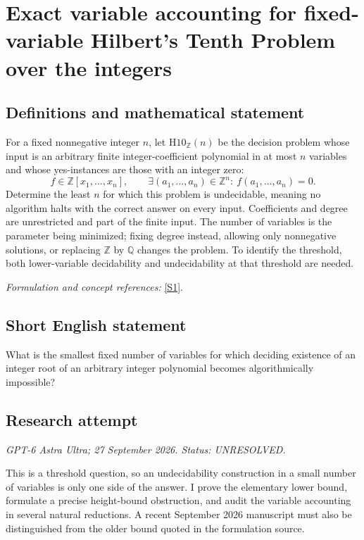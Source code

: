 \documentclass[11pt]{article}
\begin{document}
\section*{\texorpdfstring{Exact variable accounting for fixed-variable Hilbert's Tenth Problem over the integers}{Exact variable accounting for fixed-variable Hilbert's Tenth Problem over the integers}}\label{20002352}
\subsection{Definitions and mathematical statement}
For a fixed nonnegative integer $n$, let $\mathrm{H10}_{{\mathbb{Z}}}(n)$ be the decision problem whose input is an arbitrary finite integer-coefficient polynomial in at most $n$ variables and whose yes-instances are those with an integer zero:
\[
 f\in{\mathbb{Z}}[x_1,\ldots,x_n],\qquad
 \exists (a_1,\ldots,a_n)\in{\mathbb{Z}}^n:\ f(a_1,\ldots,a_n)=0.
\]
Determine the least $n$ for which this problem is undecidable, meaning no algorithm halts with the correct answer on every input. Coefficients and degree are unrestricted and part of the finite input. The number of variables is the parameter being minimized; fixing degree instead, allowing only nonnegative solutions, or replacing ${\mathbb{Z}}$ by ${\mathbb{Q}}$ changes the problem. To identify the threshold, both lower-variable decidability and undecidability at that threshold are needed.
\par\smallskip\textit{Formulation and concept references:} \href{https://www.cs.umd.edu/users/gasarch/open/hilbert10openproblems.pdf}{[S1]}.

\subsection{Short English statement}
What is the smallest fixed number of variables for which deciding existence of an integer root of an arbitrary integer polynomial becomes algorithmically impossible?
\subsection{Research attempt}
\textit{GPT-6 Astra Ultra; 27 September 2026. Status: UNRESOLVED.}

This is a threshold question, so an undecidability construction in a
small number of variables is only one side of the answer. I prove the
elementary lower bound, formulate a precise height-bound obstruction,
and audit the variable accounting in several natural reductions. A
recent September 2026 manuscript must also be distinguished from the
older bound quoted in the formulation source.
\end{document}
